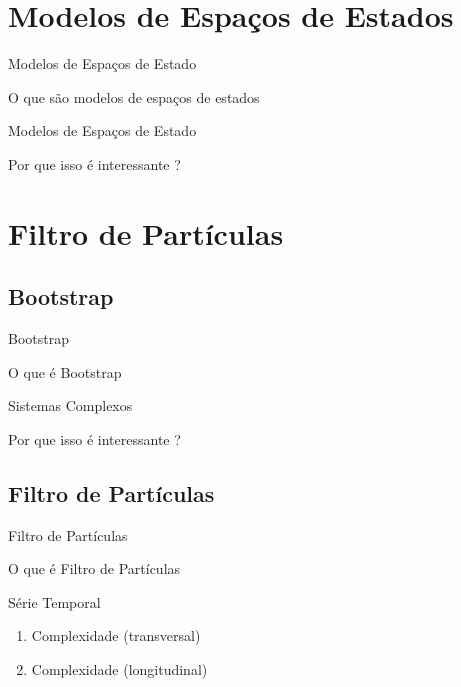\documentclass{beamer}
\begin{document}
\section{Modelos de Espaços de Estados}

\begin{frame}{Modelos de Espaços de Estado}

O que são modelos de espaços de estados

\end{frame}


\begin{frame}{Modelos de Espaços de Estado}

Por que isso é interessante ?

\end{frame}


\section{Filtro de Partículas}

\subsection{Bootstrap}

\begin{frame}{Bootstrap}

O que é Bootstrap

\end{frame}




\begin{frame}{Sistemas Complexos}


Por que isso é interessante ?

\end{frame}



\subsection{Filtro de Partículas}

\begin{frame}{Filtro de Partículas}

O que é Filtro de Partículas

\end{frame}



\begin{frame}{Série Temporal}


\begin{enumerate}

\item Complexidade (transversal)

\item  Complexidade (longitudinal)

\end{enumerate}

\end{frame}
\end{document}
